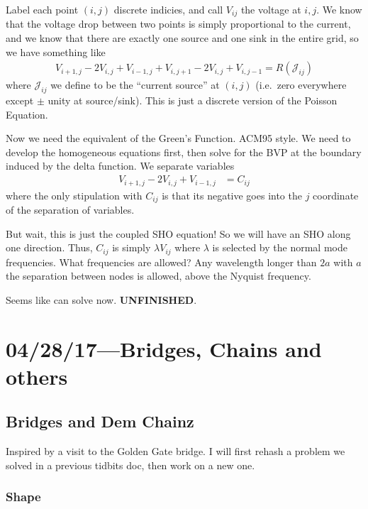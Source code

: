 \documentclass[12pt]{report}
\begin{document}
Label each point $(i,j)$ discrete indicies, and call $V_{ij}$ the voltage at
$i,j$. We know that the voltage drop between two points is simply proportional
to the current, and we know that there are exactly one source and one sink in
the entire grid, so we have something like
\begin{align}
    V_{i+1,j} - 2V_{i,j} + V_{i-1,j} + V_{i,j+1} - 2V_{i,j} + V_{i,j-1} =
        R\left( \mathcal{J}_{ij} \right)
\end{align}
where $\mathcal{J}_{ij}$ we define to be the ``current source'' at $(i,j)$
(i.e.\ zero everywhere except $\pm$ unity at source/sink). This is just a
discrete version of the Poisson Equation.

Now we need the equivalent of the Green's Function. ACM95 style. We need to
develop the homogeneous equations first, then solve for the BVP at the boundary
induced by the delta function. We separate variables
\begin{align}
    V_{i+1,j} - 2V_{i,j} + V_{i-1,j} &= C_{ij}
\end{align}
where the only stipulation with $C_{ij}$ is that its negative goes into the $j$
coordinate of the separation of variables.

But wait, this is just the coupled SHO equation! So we will have an SHO along
one direction. Thus, $C_{ij}$ is simply $\lambda V_{ij}$ where $\lambda$ is
selected by the normal mode frequencies. What frequencies are allowed? Any
wavelength longer than $2a$ with $a$ the separation between nodes is allowed,
above the Nyquist frequency.

Seems like can solve now. \textbf{UNFINISHED}.

\chapter{04/28/17---Bridges,  Chains and others}

\section{Bridges and Dem Chainz}

Inspired by a visit to the Golden Gate bridge. I will first rehash a problem we
solved in a previous tidbits doc, then work on a new one.

\subsection{Shape}
\end{document}
